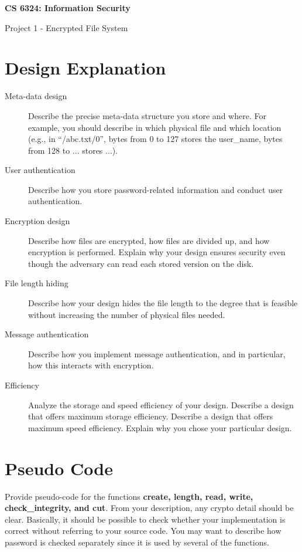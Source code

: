 \documentclass[11pt]{article}
\begin{document}
\thispagestyle{empty}

\noindent \textbf{CS 6324: Information Security}
\begin{center}
{\LARGE Project 1 - Encrypted File System}
\end{center}

\section*{Design Explanation}

\begin{description}
 \item[Meta-data design]
Describe the precise meta-data structure you store and where.  For example, you should describe in which physical file and which location (e.g., in ``/abc.txt/0'', bytes from 0 to 127 stores the user\_name, bytes from 128 to ... stores ...).

 \item[User authentication]
Describe how you store password-related information and conduct user authentication.

 \item[Encryption design]
Describe how files are encrypted, how files are divided up, and how encryption is performed. Explain why your design ensures security even though the adversary can read each stored version on the disk.

 \item[File length hiding]
Describe how your design hides the file length to the degree that is feasible without increasing the number of physical files needed.

 \item[Message authentication]
Describe how you implement message authentication, and in particular, how this interacts with encryption.

 \item[Efficiency]
Analyze the storage and speed efficiency of your design. Describe a design that offers maximum storage efficiency. Describe a design that offers maximum speed efficiency. Explain why you chose your particular design.
\end{description}


\section*{Pseudo Code}

Provide pseudo-code for the functions \textbf{create, length, read, write, check\_integrity, and cut}. From your description, any crypto detail should be clear.  Basically, it should be possible to check whether your implementation is correct without referring to your source code.  You may want to describe how password is checked separately since it is used by several of the functions.
\end{document}
